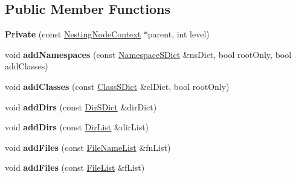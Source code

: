 \subsection*{Public Member Functions}
\begin{DoxyCompactItemize}
\item 
\mbox{\label{class_nesting_context_1_1_private_a06db2c4640ba5fa80ba2905e95297a77}} 
{\bfseries Private} (const \mbox{\hyperlink{class_nesting_node_context}{Nesting\+Node\+Context}} $\ast$parent, int level)
\item 
\mbox{\label{class_nesting_context_1_1_private_abdb93dd1c46045710a4faef55e9121fd}} 
void {\bfseries add\+Namespaces} (const \mbox{\hyperlink{class_namespace_s_dict}{Namespace\+S\+Dict}} \&ns\+Dict, bool root\+Only, bool add\+Classes)
\item 
\mbox{\label{class_nesting_context_1_1_private_a75ae365ff6c6cfb143d865d07c380440}} 
void {\bfseries add\+Classes} (const \mbox{\hyperlink{class_class_s_dict}{Class\+S\+Dict}} \&cl\+Dict, bool root\+Only)
\item 
\mbox{\label{class_nesting_context_1_1_private_a6c44584d0dfc175ba2220c33813cbd32}} 
void {\bfseries add\+Dirs} (const \mbox{\hyperlink{class_dir_s_dict}{Dir\+S\+Dict}} \&dir\+Dict)
\item 
\mbox{\label{class_nesting_context_1_1_private_a09745a4c8ba02a69f0b79fdfb204abcd}} 
void {\bfseries add\+Dirs} (const \mbox{\hyperlink{class_dir_list}{Dir\+List}} \&dir\+List)
\item 
\mbox{\label{class_nesting_context_1_1_private_a2533e79fd50dca33e031011f141c2894}} 
void {\bfseries add\+Files} (const \mbox{\hyperlink{class_file_name_list}{File\+Name\+List}} \&fn\+List)
\item 
\mbox{\label{class_nesting_context_1_1_private_afd0b8ef6db6e2d988e8f3c9dc0d30cc0}} 
void {\bfseries add\+Files} (const \mbox{\hyperlink{class_file_list}{File\+List}} \&f\+List)
\item 
\mbox{\label{class_nesting_context_1_1_private_a8d5958dc1738ef02fbe7e915a333d153}} 

\end{DoxyCompactItemize}

